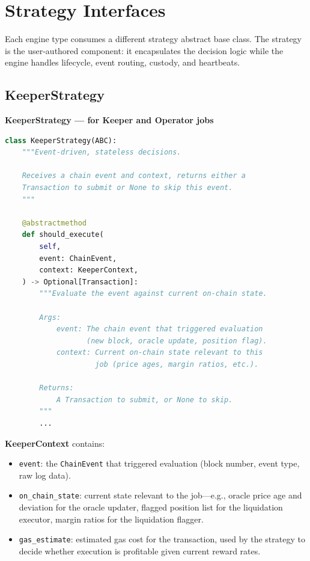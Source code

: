 \documentclass[11pt,a4paper]{article}
\begin{document}
\section{Strategy Interfaces}

Each engine type consumes a different strategy abstract base class. The strategy
is the user-authored component: it encapsulates the decision logic while the engine
handles lifecycle, event routing, custody, and heartbeats.

\subsection{KeeperStrategy}

\begin{contractbox}
\textbf{KeeperStrategy --- for Keeper and Operator jobs}
\begin{lstlisting}[language=Python]
class KeeperStrategy(ABC):
    """Event-driven, stateless decisions.

    Receives a chain event and context, returns either a
    Transaction to submit or None to skip this event.
    """

    @abstractmethod
    def should_execute(
        self,
        event: ChainEvent,
        context: KeeperContext,
    ) -> Optional[Transaction]:
        """Evaluate the event against current on-chain state.

        Args:
            event: The chain event that triggered evaluation
                   (new block, oracle update, position flag).
            context: Current on-chain state relevant to this
                     job (price ages, margin ratios, etc.).

        Returns:
            A Transaction to submit, or None to skip.
        """
        ...
\end{lstlisting}
\end{contractbox}

\textbf{KeeperContext} contains:
\begin{itemize}[leftmargin=2em]
  \item \texttt{event}: the \texttt{ChainEvent} that triggered evaluation (block number, event type, raw log data).
  \item \texttt{on\_chain\_state}: current state relevant to the job---e.g., oracle price age and deviation for the oracle updater, flagged position list for the liquidation executor, margin ratios for the liquidation flagger.
  \item \texttt{gas\_estimate}: estimated gas cost for the transaction, used by the strategy to decide whether execution is profitable given current reward rates.
\end{itemize}
\end{document}
